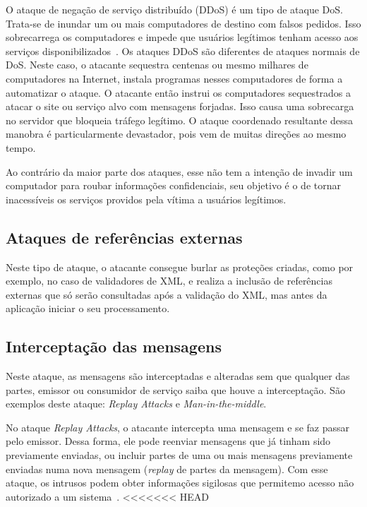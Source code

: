 O ataque de negação de serviço distribuído (DDoS) é um tipo de ataque DoS. Trata-se de inundar um ou mais computadores de destino com falsos pedidos. Isso sobrecarrega os computadores e impede que usuários legítimos tenham acesso aos serviços disponibilizados~\cite{kim2010fundamentals}.
Os ataques DDoS são diferentes de ataques normais de DoS. Neste caso, o atacante sequestra centenas ou mesmo milhares de computadores na Internet, instala programas nesses computadores de forma a automatizar o ataque. O atacante então instrui os computadores sequestrados a atacar o site ou serviço alvo com mensagens forjadas. Isso causa uma sobrecarga no servidor que bloqueia tráfego legítimo. O ataque coordenado resultante dessa manobra é particularmente devastador,  pois vem de muitas direções ao mesmo tempo.

Ao contrário da maior parte dos ataques, esse não tem a intenção de invadir um computador para roubar informações confidenciais, seu objetivo é o de tornar inacessíveis os serviços providos pela vítima a usuários legítimos.

\subsection{Ataques de referências externas}

Neste tipo de ataque, o atacante consegue burlar as proteções criadas, como por exemplo, no caso de validadores de XML, e realiza a inclusão de referências externas que só serão consultadas após a validação do XML, mas antes da aplicação iniciar o seu processamento.

\subsection{Interceptação das mensagens}

Neste ataque, as mensagens são interceptadas e alteradas sem que qualquer das partes, emissor ou consumidor de serviço saiba que houve a interceptação. São exemplos deste ataque: \emph{Replay Attacks} e \emph{Man-in-the-middle}.

No ataque \emph{Replay Attacks}, o atacante intercepta uma mensagem  e se faz passar pelo emissor. Dessa forma, ele pode reenviar mensagens que já tinham sido previamente enviadas, ou incluir partes de uma ou mais mensagens previamente enviadas numa nova mensagem (\emph{replay} de partes da mensagem). Com esse ataque, os intrusos podem obter informações sigilosas que permitemo acesso não autorizado a um sistema~\cite{kim2010fundamentals}.
<<<<<<< HEAD

